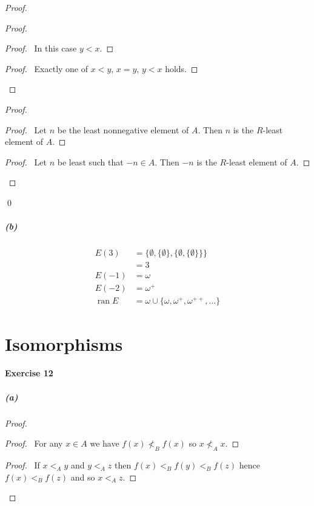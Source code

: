 \documentclass{report}
\newcommand{\ran}{\ensuremath{\operatorname{ran}}}
\begin{document}
\begin{proof}
\begin{proof}
            \begin{proof}
                \pf\ In this case $y < x$.
            \end{proof}
            \begin{proof}
                \pf\ Exactly one of $x < y$, $x = y$, $y < x$ holds.
            \end{proof}
        \end{proof}
        \begin{proof}
            \begin{proof}
                \pf\ Let $n$ be the least nonnegative element of $A$. Then $n$ is the $R$-least element of $A$.
            \end{proof}
            \begin{proof}
                \pf\ Let $n$ be least such that $-n \in A$. Then $-n$ is the $R$-least element of $A$.
            \end{proof}
        \end{proof}
        \qed
     \end{proof}

     \subparagraph{(b)}
     \begin{align*}
        E(3) & = \{ \emptyset, \{ \emptyset \}, \{ \emptyset, \{ \emptyset \} \} \} \\
        & = 3 \\
        E(-1) & = \omega \\
        E(-2) & = \omega^+ \\
        \ran E & = \omega \cup \{ \omega, \omega^+, \omega^{++}, \ldots \}
     \end{align*}

     \section{Isomorphisms}

     \paragraph{Exercise 12}
     \subparagraph{(a)}
     \begin{proof}
        \pf
        \begin{proof}
            \pf\ For any $x \in A$ we have $f(x) \nless_B f(x)$ so $x \nless_A x$.
        \end{proof}
        \begin{proof}
            \pf\ If $x <_A y$ and $y <_A z$ then $f(x) <_B f(y) <_B f(z)$ hence $f(x) <_B f(z)$ and so
            $x <_A z$.
        \end{proof}
    \end{proof}
\end{document}
